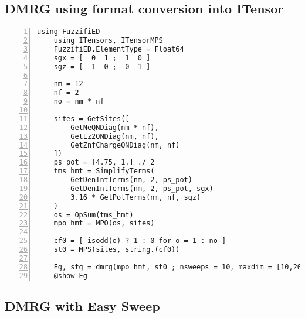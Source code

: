 \documentclass{timesjhep}
\begin{document}
\subsection{DMRG using format conversion into ITensor}

\begin{lstlisting}[numbers=left]
    using FuzzifiED
    using ITensors, ITensorMPS
    FuzzifiED.ElementType = Float64
    sgx = [  0  1 ;  1  0 ]
    sgz = [  1  0 ;  0 -1 ]

    nm = 12
    nf = 2
    no = nm * nf

    sites = GetSites([
        GetNeQNDiag(nm * nf), 
        GetLz2QNDiag(nm, nf),
        GetZnfChargeQNDiag(nm, nf)
    ])
    ps_pot = [4.75, 1.] ./ 2
    tms_hmt = SimplifyTerms(
        GetDenIntTerms(nm, 2, ps_pot) - 
        GetDenIntTerms(nm, 2, ps_pot, sgx) - 
        3.16 * GetPolTerms(nm, nf, sgz)
    )
    os = OpSum(tms_hmt)
    mpo_hmt = MPO(os, sites)

    cf0 = [ isodd(o) ? 1 : 0 for o = 1 : no ]
    st0 = MPS(sites, string.(cf0))

    Eg, stg = dmrg(mpo_hmt, st0 ; nsweeps = 10, maxdim = [10,20,50,100,200,500], noise = [1E-4,3E-5,1E-5,3E-6,1E-6,3E-7], cutoff = [1E-8])
    @show Eg
\end{lstlisting}

\subsection{DMRG with Easy Sweep}
\end{document}

